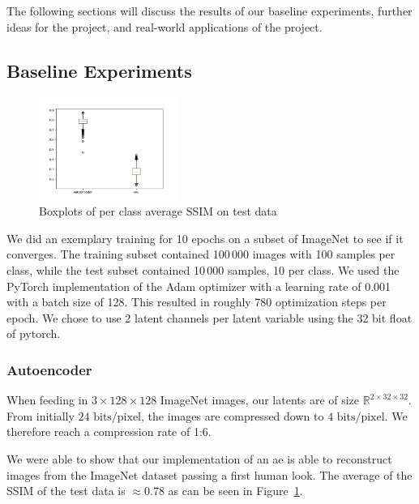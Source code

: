 The following sections will discuss the results of our baseline experiments, further ideas for the project, and real-world applications of the project.

\subsection{Baseline Experiments}\label{subsec:baseline-results}
\begin{figure}
    \centering
    \includegraphics[width=0.4\textwidth]{../../sample_images/evaluation/boxplot_ae_and_vae}
    \vspace{-20pt}
    \caption{Boxplots of per class average SSIM on test data}
    \label{fig:boxplots}
\end{figure}

We did an exemplary training for 10 epochs on a subset of ImageNet to see if it converges.
The training subset contained 100\,000 images with 100 samples per class, while the test subset contained 10\,000
samples, 10 per class.
We used the PyTorch implementation of the Adam optimizer with a learning rate of 0.001 with a batch size of 128.
This resulted in roughly 780 optimization steps per epoch.
We chose to use 2 latent channels per latent variable using the 32 bit float of pytorch.

\subsubsection{Autoencoder}\label{subsubsec:autoencoder}
When feeding in $3 \times 128 \times 128$ ImageNet images, our latents are of size $\mathbb{R}^{2\times 32 \times 32}$.
From initially $24\text{ bits/pixel}$, the images are compressed down to $4\text{ bits/pixel}$.
We therefore reach a compression rate of 1:6.

We were able to show that our implementation of an \ac{ae} is able to reconstruct images from the ImageNet dataset
passing a first human look.
The average of the SSIM of the test data is $\approx 0.78$ as can be seen in Figure~\ref{fig:boxplots}.

